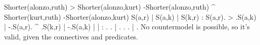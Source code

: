 \problems
{}
\argument
 Shorter(alonzo,ruth) > Shorter(alonzo,kurt)
 -Shorter(alonzo,ruth) ^ Shorter(kurt,ruth)
\argumentline
 -Shorter(alonzo,kurt)
\endargument
	\answer
	\truthtable
	 S(a,r) | S(a,k) | S(k,r) : S(a,r). > .S(a,k) | -.S(a,r). ^ .S(k,r) | -.S(a,k)
	\truthtableline
	        |        |        :       .   .       |  .      .   .       |  .   
	\endtruthtable
	No countermodel is possible, so it's valid, given the connectives and predicates.
	\OR
	\heightmodel
	 
	\endheightmodel
	\endanswer

\endproblems
\bye
